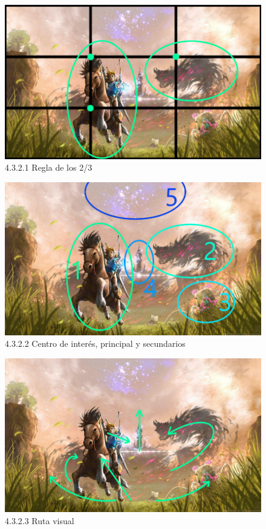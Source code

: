 \documentclass[12pt]{article}
\begin{document}
        
    \begin{figure}[H]
      \centering
      \includegraphics[scale=0.7]{images/Saúl/Sección 17/EA_img17_2Composicion_1Regla2-3.png}
      \caption{\small 4.3.2.1 Regla de los 2/3}
    \end{figure}



    \begin{figure}[H]
      \centering
      \includegraphics[scale=0.7]{images/Saúl/Sección 17/EA_img17_2Composicion_2PuntosInteres.png}
      \caption{\small 4.3.2.2 Centro de interés, principal y secundarios}
    \end{figure}



    \begin{figure}[H]
      \centering
      \includegraphics[scale=0.7]{images/Saúl/Sección 17/EA_img17_2Composicion_3RutaVisual.png}
      \caption{\small 4.3.2.3 Ruta visual}
    \end{figure}
\end{document}
